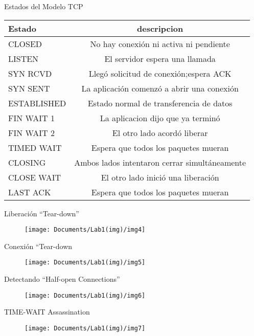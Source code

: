 \documentclass[12pt]{beamer}
\begin{document}
\begin{frame}{Estados del Modelo TCP}	
\begin{table}[]
	\begin{tabular}{|l|c|}
		\hline
		\textbf{Estado}&\textbf{descripcion}  \\ \hline
	CLOSED&No hay conexión ni activa ni pendiente  \\ \hline
	LISTEN&El servidor espera una llamada  \\ \hline
	SYN RCVD&Llegó solicitud de conexión;espera ACK  \\ \hline
	SYN SENT&La aplicación comenzó a abrir una conexión  \\ \hline
	ESTABLISHED&Estado normal de transferencia de datos  \\ \hline
	FIN WAIT 1& La aplicacion dijo que ya terminó \\ \hline
	FIN WAIT 2& El otro lado acordó liberar \\ \hline
	TIMED WAIT& Espera que todos los paquetes mueran \\ \hline
	CLOSING&Ambos lados intentaron cerrar simultáneamente  \\ \hline
	CLOSE WAIT& El otro lado inició una liberación \\ \hline
	LAST ACK&Espera que todos los paquetes mueran  \\ \hline
	\end{tabular}
\end{table}
\end{frame}
\begin{frame}{Liberación “Tear-down”}	
	\begin{figure}
		\centering
		\texttt{[image: Documents/Lab1(img)/img4]}
		\label{fig:img4}
	\end{figure}
\end{frame}
\begin{frame}{Conexión “Tear-down}	
	\begin{figure}
		\centering
		\texttt{[image: Documents/Lab1(img)/img5]}
		\label{fig:img5}
	\end{figure}
\end{frame}
\begin{frame}{Detectando “Half-open Connections”}	
	\begin{figure}
		\centering
		\texttt{[image: Documents/Lab1(img)/img6]}
		\label{fig:img6}
	\end{figure}
\end{frame}
\begin{frame}{TIME-WAIT Assassination}	
	\begin{figure}
		\centering
		\texttt{[image: Documents/Lab1(img)/img7]}
		\label{fig:img7}
	\end{figure}
\end{frame}
\end{document}
